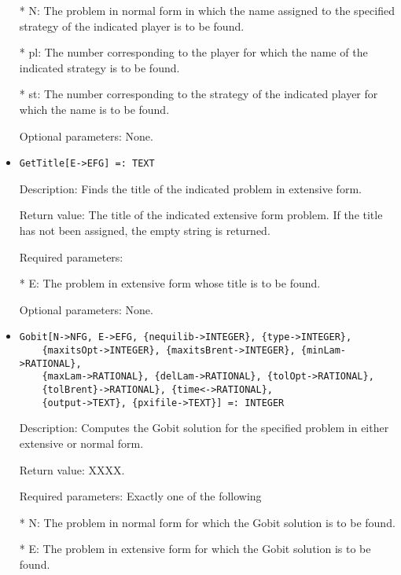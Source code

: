 \begin{itemize}
\bd
\item
[* N:] The problem in normal form in which the name assigned to the
specified strategy of the indicated player is to be found.
\item
[* pl:] The number corresponding to the player for which the name of
the indicated strategy is to be found.
\item
[* st:] The number corresponding to the strategy of the indicated 
player for which the name is to be found.
\ed

\item
[Optional parameters:] None.
\ed

\item
\begin{verbatim}
GetTitle[E->EFG] =: TEXT
\end{verbatim}

\bd
\item
[Description:] Finds the title of the indicated problem in extensive form.
\item
[Return value:] The title of the indicated extensive form problem.  If
the title has not been assigned, the empty string is returned.
\item
[Required parameters:]\hfil\null

\bd
\item
[* E:] The problem in extensive form whose title is to be found.
\ed

\item
[Optional parameters:] None.
\ed

\item
\begin{verbatim}
Gobit[N->NFG, E->EFG, {nequilib->INTEGER}, {type->INTEGER},
	{maxitsOpt->INTEGER}, {maxitsBrent->INTEGER}, {minLam->RATIONAL},
	{maxLam->RATIONAL}, {delLam->RATIONAL}, {tolOpt->RATIONAL},
	{tolBrent}->RATIONAL}, {time<->RATIONAL}, 
	{output->TEXT}, {pxifile->TEXT}] =: INTEGER
\end{verbatim}

\bd
\item
[Description:] Computes the Gobit solution for the specified problem in
either extensive or normal form.  
\item
[Return value:] XXXX.
\item 
[Required parameters:]\hfil\null Exactly one of the following

\bd
\item
[* N:] The problem in normal form for which the Gobit solution is to
be found.
\item	
[* E:] The problem in extensive form for which the Gobit solution 
is to be found.
\ed


\end{itemize}
